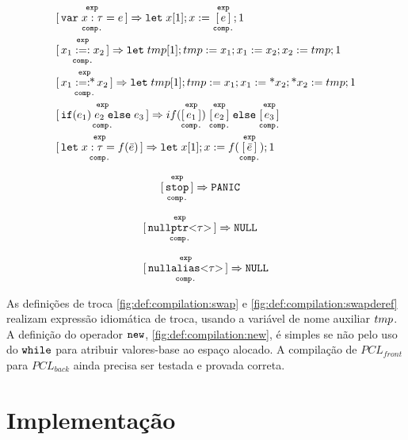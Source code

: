 \begin{figure}[ht]
\begin{align}
		&\compe{\KW{var}\; x: \tau = e} \Rightarrow \KW{let}\;x[1]; x := \compe{e}; 1 \\
		&\compe{x_1 :=: x_2} \Rightarrow \KW{let}\;\TMP[1]; \TMP := x_1; x_1 := x_2; x_2 := \TMP; 1 \label{fig:def:compilation:swap}\\
		&\compe{x_1 :=:\!\!\text{*}\,x_2} \Rightarrow \KW{let}\;\TMP[1]; \TMP := x_1; x_1 := \text{*}x_2; \text{*}x_2 := \TMP; 1 \label{fig:def:compilation:swapderef}\\
		&\compe{\KW{if}(e_1)\;e_2\;\KW{else}\;e_3} \Rightarrow if(\compe{e_1})\;\compe{e_2}\;\KW{else}\;\compe{e_3}\\
		&\compe{\KW{let}\; x: \tau = f(\bar e)} \Rightarrow \KW{let}\;x[1]; x := f(\compe{\bar e}); 1 
	\end{align}
	\begin{minipage}{.25\linewidth}
		\begin{align}
			&\overset{\texttt{exp}}{\underset{\texttt{comp.}}{[\,\texttt{stop}\,]}} \Rightarrow \texttt{PANIC}
		\end{align}
	\end{minipage}
	\hspace{0.02\linewidth}
	\begin{minipage}{.30\linewidth}
		\begin{align}
			&\overset{\texttt{exp}}{\underset{\texttt{comp.}}{[\,\texttt{nullptr}\text{<}\tau\text{>}\,]}} \Rightarrow \texttt{NULL} 
		\end{align}
	\end{minipage}
	\hspace{0.02\linewidth}
	\begin{minipage}{.33\linewidth}
		\begin{align}
			\overset{\texttt{exp}}{\underset{\texttt{comp.}}{[\,\texttt{nullalias}\text{<}\tau\text{>}\,]}} \Rightarrow \texttt{NULL} 
		\end{align}
	\end{minipage}
\end{figure}

As definições de troca \ref{fig:def:compilation:swap} e \ref{fig:def:compilation:swapderef} realizam expressão idiomática de troca, usando a variável de nome auxiliar $\TMP$. A definição do operador $\texttt{new}$, \ref{fig:def:compilation:new}, é simples se não pelo uso do  $\texttt{while}$ para atribuir valores-base ao espaço alocado. A compilação de $PCL_{front}$ para $PCL_{back}$ ainda precisa ser testada e provada correta.

\section{Implementação}

